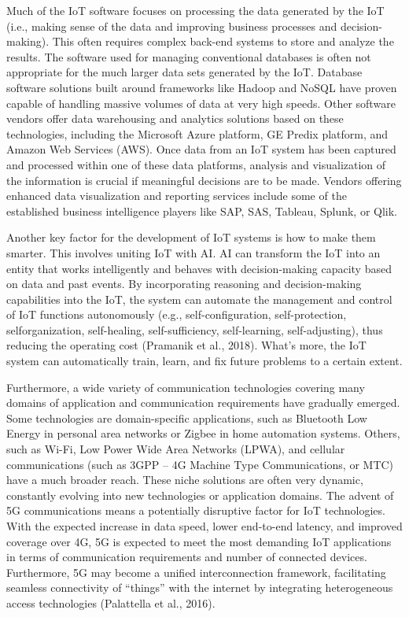 \documentclass[
  letterpaper,
  DIV=11,
  numbers=noendperiod]{scrreprt}
\begin{document}
Much of the IoT software focuses on processing the data generated by the
IoT (i.e., making sense of the data and improving business processes and
decision-making). This often requires complex back-end systems to store
and analyze the results. The software used for managing conventional
databases is often not appropriate for the much larger data sets
generated by the IoT. Database software solutions built around
frameworks like Hadoop and NoSQL have proven capable of handling massive
volumes of data at very high speeds. Other software vendors offer data
warehousing and analytics solutions based on these technologies,
including the Microsoft Azure platform, GE Predix platform, and Amazon
Web Services (AWS). Once data from an IoT system has been captured and
processed within one of these data platforms, analysis and visualization
of the information is crucial if meaningful decisions are to be made.
Vendors offering enhanced data visualization and reporting services
include some of the established business intelligence players like SAP,
SAS, Tableau, Splunk, or Qlik.

Another key factor for the development of IoT systems is how to make
them smarter. This involves uniting IoT with AI. AI can transform the
IoT into an entity that works intelligently and behaves with
decision-making capacity based on data and past events. By incorporating
reasoning and decision-making capabilities into the IoT, the system can
automate the management and control of IoT functions autonomously (e.g.,
self-configuration, self-protection, selforganization, self-healing,
self-sufficiency, self-learning, self-adjusting), thus reducing the
operating cost (Pramanik et al., 2018). What's more, the IoT system can
automatically train, learn, and fix future problems to a certain extent.

Furthermore, a wide variety of communication technologies covering many
domains of application and communication requirements have gradually
emerged. Some technologies are domain-specific applications, such as
Bluetooth Low Energy in personal area networks or Zigbee in home
automation systems. Others, such as Wi-Fi, Low Power Wide Area Networks
(LPWA), and cellular communications (such as 3GPP -- 4G Machine Type
Communications, or MTC) have a much broader reach. These niche solutions
are often very dynamic, constantly evolving into new technologies or
application domains. The advent of 5G communications means a potentially
disruptive factor for IoT technologies. With the expected increase in
data speed, lower end-to-end latency, and improved coverage over 4G, 5G
is expected to meet the most demanding IoT applications in terms of
communication requirements and number of connected devices. Furthermore,
5G may become a unified interconnection framework, facilitating seamless
connectivity of ``things'' with the internet by integrating
heterogeneous access technologies (Palattella et al., 2016).
\end{document}
